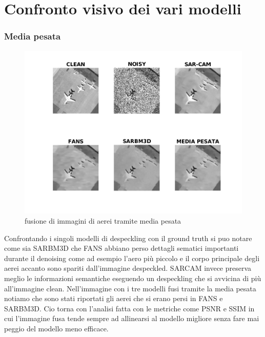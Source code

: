   \section{Confronto visivo dei vari modelli}
  \subsubsection{Media pesata}
  \begin{figure}[H]
    \centering
    \includegraphics[width=1.1\textwidth]{utils/MPairplane00.png}
    \caption{fusione di immagini di aerei tramite media pesata}
    \label{fig:airplane00MP}
  \end{figure}
Confrontando i singoli modelli di despeckling con il ground truth si puo notare come sia SARBM3D che FANS abbiano 
perso dettagli sematici importanti durante il denoising come ad esempio l'aero più piccolo e il corpo principale degli aerei accanto sono spariti dall'immagine despeckled.
SARCAM invece preserva meglio le informazioni semantiche eseguendo un despeckling che si avvicina di più all'immagine clean.
Nell'immagine con i tre modelli fusi tramite la media pesata notiamo che sono stati riportati gli aerei che si erano persi in FANS e SARBM3D. 
Cio torna con l'analisi fatta con le metriche come PSNR e SSIM in cui l'immagine fusa tende sempre ad allinearsi al modello migliore senza fare mai 
peggio del modello meno efficace.
